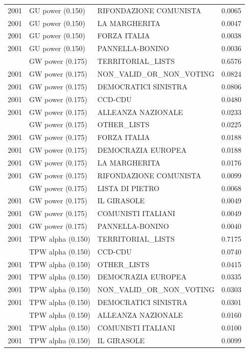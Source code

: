 \begin{longtable}[t]{rllr}
2001 & GU power (0.150) & RIFONDAZIONE COMUNISTA & 0.0065\\
2001 & GU power (0.150) & LA MARGHERITA & 0.0047\\
2001 & GU power (0.150) & FORZA ITALIA & 0.0038\\
2001 & GU power (0.150) & PANNELLA-BONINO & 0.0036\\
\addlinespace
2001 & GW power (0.175) & TERRITORIAL\_LISTS & 0.6576\\
2001 & GW power (0.175) & NON\_VALID\_OR\_NON\_VOTING & 0.0824\\
2001 & GW power (0.175) & DEMOCRATICI SINISTRA & 0.0806\\
2001 & GW power (0.175) & CCD-CDU & 0.0480\\
2001 & GW power (0.175) & ALLEANZA NAZIONALE & 0.0233\\
\addlinespace
2001 & GW power (0.175) & OTHER\_LISTS & 0.0225\\
2001 & GW power (0.175) & FORZA ITALIA & 0.0188\\
2001 & GW power (0.175) & DEMOCRAZIA EUROPEA & 0.0188\\
2001 & GW power (0.175) & LA MARGHERITA & 0.0176\\
2001 & GW power (0.175) & RIFONDAZIONE COMUNISTA & 0.0099\\
\addlinespace
2001 & GW power (0.175) & LISTA DI PIETRO & 0.0068\\
2001 & GW power (0.175) & IL GIRASOLE & 0.0049\\
2001 & GW power (0.175) & COMUNISTI ITALIANI & 0.0049\\
2001 & GW power (0.175) & PANNELLA-BONINO & 0.0040\\
2001 & TPW alpha (0.150) & TERRITORIAL\_LISTS & 0.7175\\
\addlinespace
2001 & TPW alpha (0.150) & CCD-CDU & 0.0740\\
2001 & TPW alpha (0.150) & OTHER\_LISTS & 0.0415\\
2001 & TPW alpha (0.150) & DEMOCRAZIA EUROPEA & 0.0335\\
2001 & TPW alpha (0.150) & NON\_VALID\_OR\_NON\_VOTING & 0.0303\\
2001 & TPW alpha (0.150) & DEMOCRATICI SINISTRA & 0.0301\\
\addlinespace
2001 & TPW alpha (0.150) & ALLEANZA NAZIONALE & 0.0160\\
2001 & TPW alpha (0.150) & COMUNISTI ITALIANI & 0.0100\\
2001 & TPW alpha (0.150) & IL GIRASOLE & 0.0099\\

\end{longtable}
